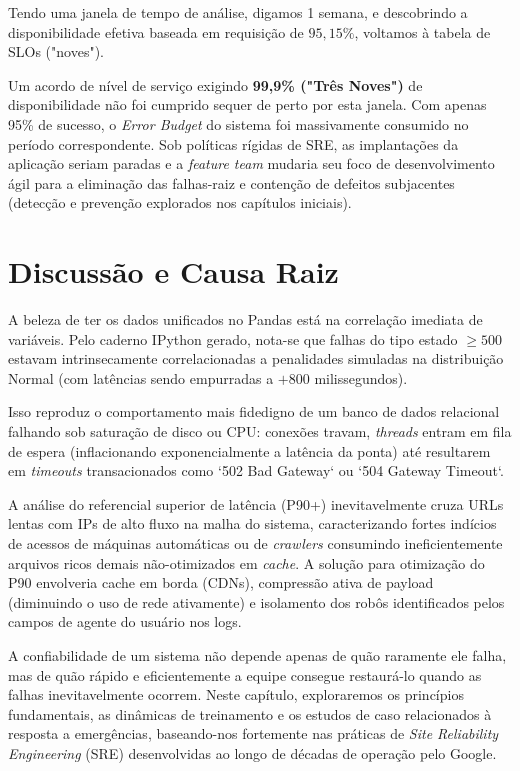 \documentclass[12pt,a4paper]{report}
\begin{document}
Tendo uma janela de tempo de análise, digamos 1 semana, e descobrindo a disponibilidade efetiva baseada em requisição de $95,15\%$, voltamos à tabela de SLOs ("noves").

Um acordo de nível de serviço exigindo \textbf{99,9\% ("Três Noves")} de disponibilidade não foi cumprido sequer de perto por esta janela. Com apenas 95\% de sucesso, o \textit{Error Budget} do sistema foi massivamente consumido no período correspondente. Sob políticas rígidas de SRE, as implantações da aplicação seriam paradas e a \textit{feature team} mudaria seu foco de desenvolvimento ágil para a eliminação das falhas-raiz e contenção de defeitos subjacentes (detecção e prevenção explorados nos capítulos iniciais).

\section{Discussão e Causa Raiz}

A beleza de ter os dados unificados no Pandas está na correlação imediata de variáveis. Pelo caderno IPython gerado, nota-se que falhas do tipo estado $\geq 500$ estavam intrinsecamente correlacionadas a penalidades simuladas na distribuição Normal (com latências sendo empurradas a $+800$ milissegundos).

Isso reproduz o comportamento mais fidedigno de um banco de dados relacional falhando sob saturação de disco ou CPU: conexões travam, \textit{threads} entram em fila de espera (inflacionando exponencialmente a latência da ponta) até resultarem em \textit{timeouts} transacionados como `502 Bad Gateway` ou `504 Gateway Timeout`.

A análise do referencial superior de latência (P90+) inevitavelmente cruza URLs lentas com IPs de alto fluxo na malha do sistema, caracterizando fortes indícios de acessos de máquinas automáticas ou de \textit{crawlers} consumindo ineficientemente arquivos ricos demais não-otimizados em \textit{cache}. A solução para otimização do P90 envolveria cache em borda (CDNs), compressão ativa de payload (diminuindo o uso de rede ativamente) e isolamento dos robôs identificados pelos campos de agente do usuário nos logs.


A confiabilidade de um sistema não depende apenas de quão raramente ele falha, mas de quão rápido e eficientemente a equipe consegue restaurá-lo quando as falhas inevitavelmente ocorrem. Neste capítulo, exploraremos os princípios fundamentais, as dinâmicas de treinamento e os estudos de caso relacionados à resposta a emergências, baseando-nos fortemente nas práticas de \textit{Site Reliability Engineering} (SRE) desenvolvidas ao longo de décadas de operação pelo Google.
\end{document}

